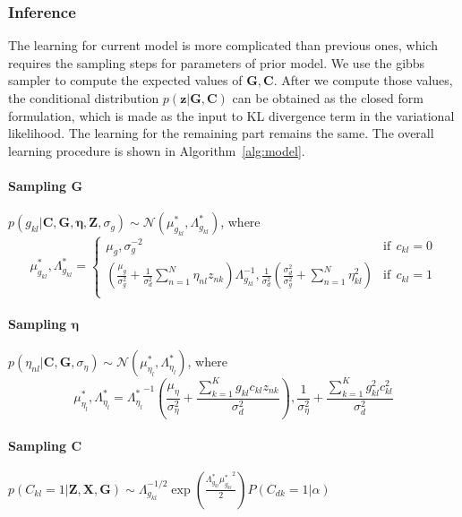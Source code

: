 \subsubsection{Inference}
The learning for current model is more complicated than previous ones, which requires the sampling steps for parameters of prior model. We use the gibbs sampler to compute the expected values of $\mathbf{G}, \mathbf{C}$. After we compute those values, the conditional distribution $p(\mathbf{z}|\mathbf{G},\mathbf{C})$ can be obtained as the closed form formulation, which is made as the input to KL divergence term in the variational likelihood. The learning for the remaining part remains the same. The overall learning procedure is shown in Algorithm~\ref{alg:model}.

\paragraph{Sampling $\mathbf{G}$} $p(g_{kl}|\mathbf{C},\mathbf{G},\mathbf{\eta}, \mathbf{Z},\sigma_g)\sim \mathcal{N}(\mu_{g_{kl}}^*, \Lambda_{g_{kl}}^*)$, where
\[ \mu_{g_{kl}}^*, \Lambda_{g_{kl}}^* =
  \begin{cases}
     \mu_g, \sigma_g^{-2}      & \text{if} ~~c_{kl} = 0\\
    \left(\frac{\mu_g}{\sigma_g^2}+\frac{1}{\sigma_d^2}\sum_{n=1}^{N}\eta_{nl}z_{nk}\right)\Lambda_{g_{kl}}^{-1}, \frac{1}{\sigma_d^2}\left(\frac{\sigma_d^2}{\sigma_g^2}+\sum_{n=1}^{N}\eta_{kl}^2\right)  & \text{if}~~ c_{kl} = 1\\
  \end{cases}
\]
\paragraph{Sampling $\mathbf{\eta}$} $p(\eta_{nl}|\mathbf{C},\mathbf{G},\sigma_{\eta})\sim \mathcal{N}(\mu_{\eta_l}^*, \Lambda_{\eta_{l}}^*)$, where
\[
\mu_{\eta_l}^*, \Lambda_{\eta_{l}}^*={\Lambda_{\eta_l}^*}^{-1}\left(\frac{\mu_\eta}{\sigma_{\eta}^2}+\frac{\sum_{k=1}^{K}g_{kl}c_{kl}z_{nk}}{\sigma_d^2}\right),
\frac{1}{\sigma_{\eta}^2}+\frac{\sum_{k=1}^{K}g_{kl}^2c_{kl}^2}{\sigma_d^2}
\]

\paragraph{Sampling $\mathbf{C}$} $p(C_{kl}=1|\mathbf{Z}, \mathbf{X}, \mathbf{G}) \sim \Lambda_{g_{kl}}^{-1/2}\exp(\frac{\Lambda_{g_{kl}}^{\ast}{\mu_{g_{kl}}^{\ast}}^2}{2})P(C_{dk}=1|\alpha)$

